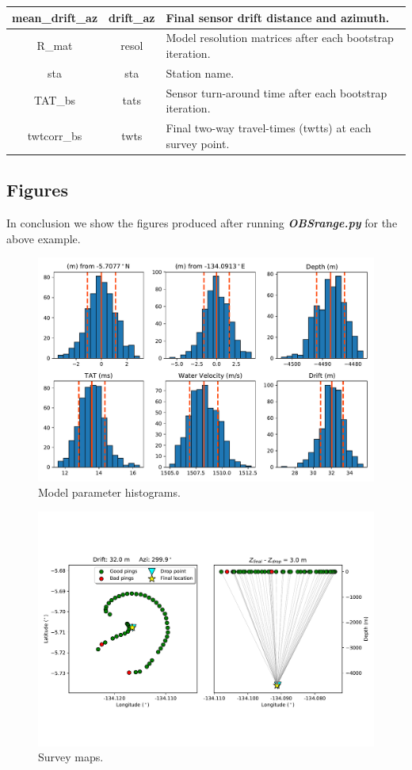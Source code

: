 \documentclass[titlepage, 12pt]{article}
\begin{document}
\begin{table}[!htb]
\begin{tabularx}{\linewidth}{|c|c|X|}
    mean\_drift\_az & drift\_az  & Final sensor drift distance and azimuth. \\ \hline
    R\_mat          & resol      & Model resolution matrices after each bootstrap iteration. \\ \hline
    sta             & sta        & Station name. \\ \hline
    TAT\_bs         & tats       & Sensor turn-around time after each bootstrap iteration. \\ \hline
    twtcorr\_bs     & twts       & Final two-way travel-times (twtts) at each survey point. \\ \hline
    \end{tabularx}
   \end{table}
  
  \newpage

  \subsection{Figures}
  In conclusion we show the figures produced after running \textit{\textbf{OBSrange.py}} for the above example.

  \begin{figure}[!htb]
   \centering
   \includegraphics[width=0.8\linewidth]{histograms.pdf}
   \caption{Model parameter histograms.}
  \end{figure}

  \begin{figure}[!htb]
   \centering
   \includegraphics[width=0.9\linewidth]{maps.pdf}
   \caption{Survey maps.}
  \end{figure}
 
\end{document}
